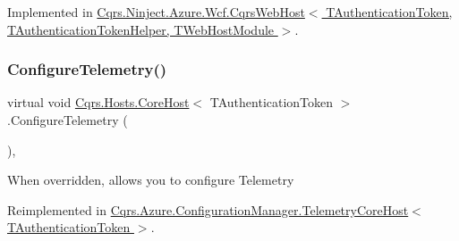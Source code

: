 Implemented in \hyperlink{classCqrs_1_1Ninject_1_1Azure_1_1Wcf_1_1CqrsWebHost_a7ea9f096372888eae726284c4a7c320a_a7ea9f096372888eae726284c4a7c320a}{Cqrs.\+Ninject.\+Azure.\+Wcf.\+Cqrs\+Web\+Host$<$ T\+Authentication\+Token, T\+Authentication\+Token\+Helper, T\+Web\+Host\+Module $>$}.

\mbox{\label{classCqrs_1_1Hosts_1_1CoreHost_a8035dd83f62ec6184854e7e833be5db9_a8035dd83f62ec6184854e7e833be5db9}} 
\subsubsection{\texorpdfstring{Configure\+Telemetry()}{ConfigureTelemetry()}}
{\footnotesize\ttfamily virtual void \hyperlink{classCqrs_1_1Hosts_1_1CoreHost}{Cqrs.\+Hosts.\+Core\+Host}$<$ T\+Authentication\+Token $>$.Configure\+Telemetry (\begin{DoxyParamCaption}{ }\end{DoxyParamCaption})\hspace{0.3cm}{\ttfamily [protected]}, {\ttfamily [virtual]}}



When overridden, allows you to configure Telemetry 



Reimplemented in \hyperlink{classCqrs_1_1Azure_1_1ConfigurationManager_1_1TelemetryCoreHost_abcb4e14f33f2b85b95a2b80c4555748a_abcb4e14f33f2b85b95a2b80c4555748a}{Cqrs.\+Azure.\+Configuration\+Manager.\+Telemetry\+Core\+Host$<$ T\+Authentication\+Token $>$}.

\mbox{\label{classCqrs_1_1Hosts_1_1CoreHost_a834781c47df7220f4b62a90d0333ab18_a834781c47df7220f4b62a90d0333ab18}} 
